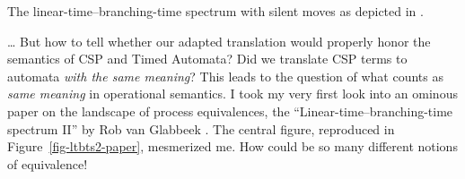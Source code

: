 \documentclass[
  a4paper,
]{report}
\theoremstyle{plain}
\theoremstyle{plain}
\theoremstyle{definition}
\theoremstyle{plain}
\theoremstyle{definition}
\theoremstyle{remark}
\begin{document}
\begin{marginfigure}


\caption{\label{fig-ltbts2-paper}The linear-time--branching-time
spectrum with silent moves as depicted in \citet{glabbeek1993ltbt}.}

\end{marginfigure}%

\ldots{} But how to tell whether our adapted translation would properly
honor the semantics of CSP and Timed Automata? Did we translate CSP
terms to automata \emph{with the same meaning}? This leads to the
question of what counts as \emph{same meaning} in operational semantics.
I took my very first look into an ominous paper on the landscape of
process equivalences, the ``Linear-time--branching-time spectrum II'' by
Rob van Glabbeek \citeyearpar{glabbeek1993ltbt}. The central figure,
reproduced in Figure~\ref{fig-ltbts2-paper}, mesmerized me. How could be
so many different notions of equivalence!
\end{document}
